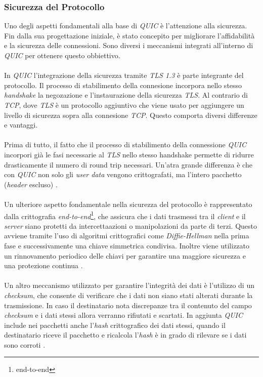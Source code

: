\subsubsection{Sicurezza del Protocollo}
Uno degli aspetti fondamentali alla base di \emph{QUIC} è l'attenzione alla sicurezza. Fin dalla sua progettazione iniziale, è stato concepito per migliorare l'affidabilità e la sicurezza delle connessioni. 
Sono diversi i meccanismi integrati all'interno di \emph{QUIC} per ottenere questo obbiettivo.
\\\\
In \emph{QUIC} l'integrazione della sicurezza tramite \emph{TLS 1.3} è parte integrante del protocollo. Il processo di stabilimento della connesione incorpora nello stesso \emph{handshake} la negozazione e l'instaurazione della sicurezza \emph{TLS}. 
Al contrario di \emph{TCP}, dove \emph{TLS} è un protocollo aggiuntivo che viene usato per aggiungere un livello di sicurezza sopra alla connesione \emph{TCP}. Questo comporta diversi differenze e vantaggi.
\\\\
Prima di tutto, il fatto che il processo di stabilimento della connessione \emph{QUIC} incorpori già le fasi necessarie al \emph{TLS} nello stesso handshake permette di ridurre drasticamente il numero di round trip necessari.
Un'atra grande differenza è che con \emph{QUIC} non solo gli \emph{user data} vengono crittografati, ma l'intero pacchetto (\emph{header} escluso) \cite{site:Explaining-QUIC}.
\\\\
Un ulteriore aspetto fondamentale nella sicurezza del protocollo è rappresentato dalla crittografia \emph{end-to-end}\footnote{\gls{end-to-end}}, che assicura che i dati trasmessi tra il \emph{client} e il \emph{server} siano protetti da intercettaazioni o manipolazioni da parte di terzi.
Questo avviene tramite l'uso di algoritmi crittografici come \emph{Diffie-Hellman} nella prima fase e successivamente una chiave simmetrica condivisa. Inoltre viene utilizzato un rinnovamento periodico delle chiavi per garantire una maggiore sicurezza e una protezione continua \cite{site:quic-security}.
\\\\
Un altro meccanismo utilizzato per garantire l'integrità dei dati è l'utilizzo di un \emph{checksum}, che consente di verificare che i dati non siano stati alterati durante la trasmissione. In caso il destinatario nota discrepanze tra il contenuto del campo \emph{checksum} e i dati stessi allora verranno rifiutati e scartati.
In aggiunta \emph{QUIC} include nei pacchetti anche l'\emph{hash} crittografico dei dati stessi, quando il destinatario riceve il pacchetto e ricalcola l'\emph{hash} è in grado di rilevare se i dati sono corroti \cite{site:quic-security}.
